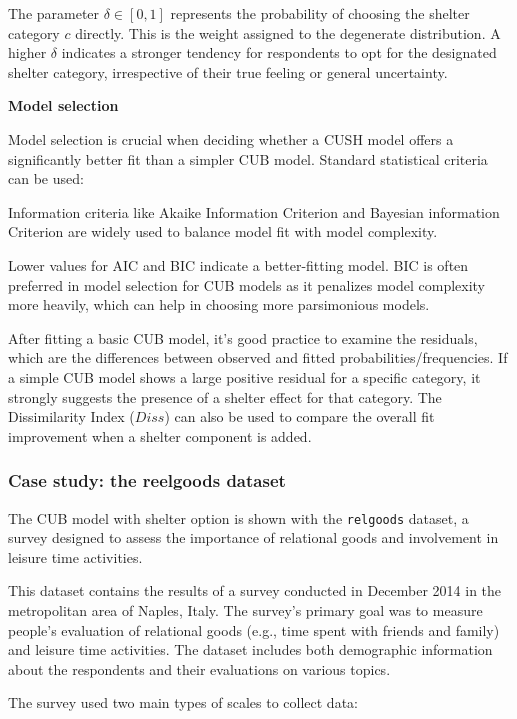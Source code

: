 \documentclass[
  letterpaper,
  DIV=11,
  numbers=noendperiod]{scrartcl}
\begin{document}
The parameter \(\delta \in [0,1]\) represents the probability of
choosing the shelter category \(c\) directly. This is the weight
assigned to the degenerate distribution. A higher \(\delta\) indicates a
stronger tendency for respondents to opt for the designated shelter
category, irrespective of their true feeling or general uncertainty.

\textbf{Model selection}

Model selection is crucial when deciding whether a CUSH model offers a
significantly better fit than a simpler CUB model. Standard statistical
criteria can be used:

Information criteria like Akaike Information Criterion and Bayesian
information Criterion are widely used to balance model fit with model
complexity.

Lower values for AIC and BIC indicate a better-fitting model. BIC is
often preferred in model selection for CUB models as it penalizes model
complexity more heavily, which can help in choosing more parsimonious
models.

After fitting a basic CUB model, it's good practice to examine the
residuals, which are the differences between observed and fitted
probabilities/frequencies. If a simple CUB model shows a large positive
residual for a specific category, it strongly suggests the presence of a
shelter effect for that category. The Dissimilarity Index (\(Diss\)) can
also be used to compare the overall fit improvement when a shelter
component is added.

\hypertarget{case-study-the-reelgoods-dataset}{%
\subsubsection{Case study: the reelgoods
dataset}\label{case-study-the-reelgoods-dataset}}

The CUB model with shelter option is shown with the \texttt{relgoods}
dataset, a survey designed to assess the importance of relational goods
and involvement in leisure time activities.

This dataset contains the results of a survey conducted in December 2014
in the metropolitan area of Naples, Italy. The survey's primary goal was
to measure people's evaluation of relational goods (e.g., time spent
with friends and family) and leisure time activities. The dataset
includes both demographic information about the respondents and their
evaluations on various topics.

The survey used two main types of scales to collect data:
\end{document}
